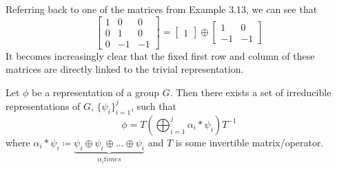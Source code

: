 \begin{example}\end{example}
	Referring back to one of the matrices from Example 3.13, we can see that
$$\begin{bmatrix}
	1 & 0 & 0 \\
	0 & 1 & 0 \\
	0 & -1 & -1
\end{bmatrix} = \begin{bmatrix}
					1
					\end{bmatrix} \oplus
					\begin{bmatrix}
						1 & 0 \\
						-1 & -1
					\end{bmatrix}$$
It becomes increasingly clear that the fixed first row and column of these matrices are directly linked to the trivial representation.


\begin{theorem}
	Let $\phi$ be a representation of a group $G$.  Then there exists a set of irreducible representations of $G$, $\{\psi_i\}_{i=1}^j$, such that $$\phi = T\left(\bigoplus_{i=1}^j \alpha_i*\psi_i\right)T^{-1}$$ where $\alpha_i*\psi_i \coloneq \underbrace{\psi_i \oplus \psi_i \oplus \hdots \oplus \psi_i}_{\alpha_i times}$ and $T$ is some invertible matrix/operator. 
\end{theorem}
 

